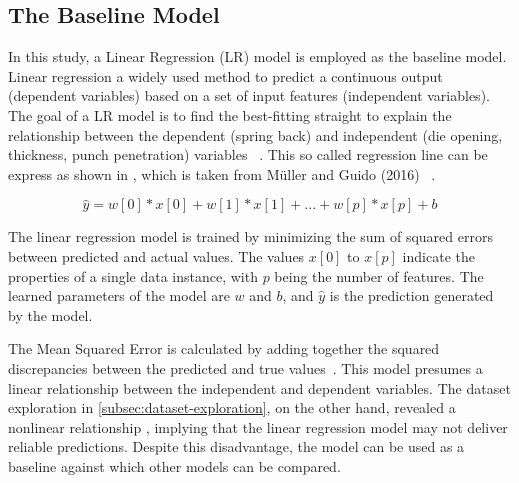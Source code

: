 
\subsection{The Baseline Model}\label{subsec:regression-models}
In this study, a Linear Regression (LR) model is employed as the baseline model.
Linear regression a widely used method to predict a continuous output (dependent variables) based on a set
of input features (independent variables).
The goal of a \ac{LR} model is to find the best-fitting straight to explain the relationship between the dependent
(spring back) and independent (die opening, thickness, punch penetration)
variables
~\cite[pp. 45--46]{muller2016introduction}.
This so called regression line can be express as shown in , which is taken from
Müller and Guido (2016)
~\cite[p. 45]{muller2016introduction}.

\begin{tcolorbox}[arc=0pt,boxrule=0.5pt]
    \begin{equation}
        \hat{y} = w[0] * x[0] + w[1] * x[1] + ... + w[p] * x[p] + b
        \label{eq:linear-regression}
    \end{equation}
\end{tcolorbox}

The linear regression model is trained by minimizing the sum of squared errors between predicted and actual values.
The values $x[0]$ to $x[p]$ indicate the properties of a single data instance, with $p$ being the number of
features.
The learned parameters of the model are $w$ and $b$, and $\hat{y}$  is the prediction generated by the model.

The Mean Squared Error is calculated by adding together the squared discrepancies between the predicted and true
values~\cite[p. 47--68]{muller2016introduction}.
This model presumes a linear relationship between the independent and dependent variables.
The dataset exploration in \cref{subsec:dataset-exploration}, on the other hand, revealed a nonlinear relationship
, implying that the linear regression model may not deliver reliable predictions.
Despite this disadvantage, the model can be used as a baseline against which other models can be compared.


